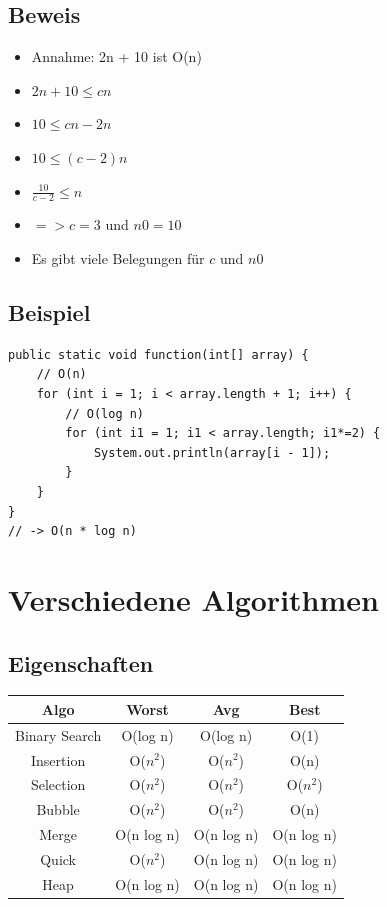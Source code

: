 \begin{multicols*}{4}
	\subsection{Beweis}
	\begin{itemize}
		\item Annahme: 2n + 10 ist O(n)
		\item $2n + 10 \leq cn$
		\item $10 \leq cn - 2n$
		\item $10 \leq (c - 2)n$
		\item $\frac{10}{c-2} \leq n$
		\item $=> c=3$ und $n0=10$
		\item Es gibt viele Belegungen für $c$ und $n0$
	\end{itemize}

	\subsection{Beispiel}
	\begin{lstlisting}
public static void function(int[] array) {
	// O(n)
	for (int i = 1; i < array.length + 1; i++) {
		// O(log n)
		for (int i1 = 1; i1 < array.length; i1*=2) {
			System.out.println(array[i - 1]);
		}
	}
}
// -> O(n * log n)
	\end{lstlisting}

\section{Verschiedene Algorithmen}
	\subsection{Eigenschaften}

	\renewcommand{\arraystretch}{1.1}
	\begin{tabular}{c | c | c | c}
		Algo & Worst & Avg & Best \\
		\hline
		Binary Search & O(log n) & O(log n) & O(1) \\
		Insertion & O($n^2$) & O($n^2$) & O(n) \\
		Selection & O($n^2$) & O($n^2$) & O($n^2$) \\
		Bubble & O($n^2$) & O($n^2$) & O(n) \\
		Merge & O(n log n) & O(n log n) & O(n log n) \\
		Quick & O($n^2$) & O(n log n) & O(n log n) \\
		Heap & O(n log n) & O(n log n) & O(n log n) \\
	\end{tabular}
	

\end{multicols*}
